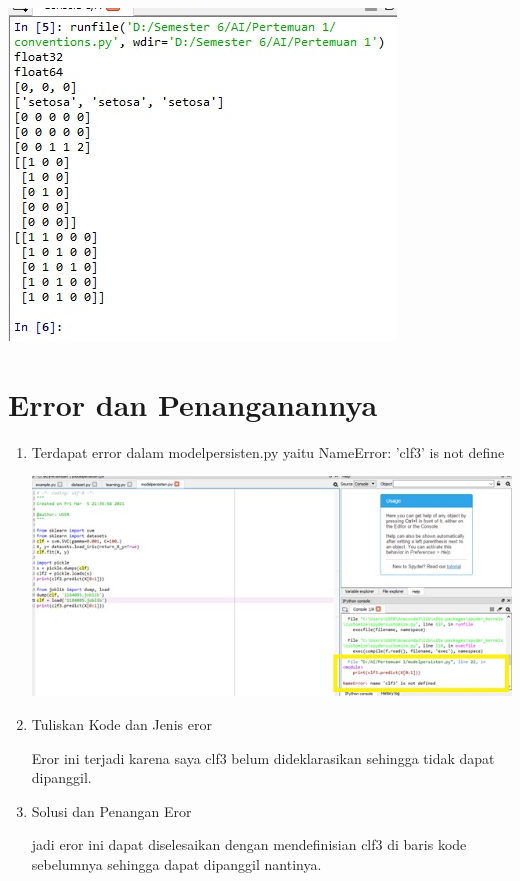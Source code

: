 \begin{enumerate}
\begin{center}
    \end{center}
    \begin{center}
    \includegraphics[scale=0.75]{figures/1184085/chapter1/12.jpg}
    \end{center}
\end{enumerate}

\section{Error dan Penanganannya}
\begin{enumerate}
    \item Terdapat error dalam modelpersisten.py yaitu NameError: 'clf3' is not define
    \begin{center}
    \includegraphics[width=.8\textwidth]{figures/1184085/chapter1/er1.jpg}
    \end{center}
    
    \item Tuliskan Kode dan Jenis eror 
    \par Eror ini terjadi karena saya clf3 belum dideklarasikan sehingga tidak dapat dipanggil.
    
    \item Solusi dan Penangan Eror 
    \par jadi eror ini dapat diselesaikan dengan mendefinisian clf3 di baris kode sebelumnya sehingga dapat dipanggil nantinya. 

\end{enumerate}
